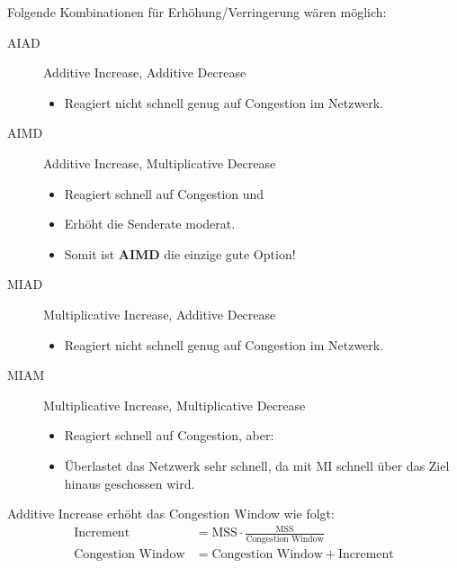                 Folgende Kombinationen für Erhöhung/Verringerung wären möglich:
                \begin{description}
                	\item[AIAD] Additive Increase, Additive Decrease
                    	\begin{itemize}
                    		\item Reagiert nicht schnell genug auf Congestion im Netzwerk.
                    	\end{itemize}
                	\item[AIMD] Additive Increase, Multiplicative Decrease
                    	\begin{itemize}
                    		\item Reagiert schnell auf Congestion und
                    		\item Erhöht die Senderate moderat.
                    		\item Somit ist \textbf{AIMD} die einzige gute Option!
                    	\end{itemize}
                	\item[MIAD] Multiplicative Increase, Additive Decrease
                    	\begin{itemize}
                    		\item Reagiert nicht schnell genug auf Congestion im Netzwerk.
                    	\end{itemize}
                	\item[MIAM] Multiplicative Increase, Multiplicative Decrease
                    	\begin{itemize}
                    		\item Reagiert schnell auf Congestion, aber:
                    		\item Überlastet das Netzwerk sehr schnell, da mit MI schnell über das Ziel hinaus geschossen wird.
                    	\end{itemize}
                \end{description}
                
                Additive Increase erhöht das Congestion Window wie folgt:
                \begin{align*}
                	\text{Increment}         & = \text{MSS} \cdot \frac{\text{MSS}}{\text{Congestion Window}} \\
                	\text{Congestion Window} & = \text{Congestion Window} + \text{Increment}
                \end{align*}
                
